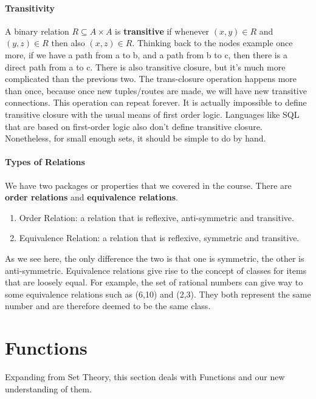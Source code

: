 \paragraph{Transitivity} A binary relation $R \subseteq A \times A$ is \textbf{transitive} if whenever $\left(x,y \right) \in R$ and $\left(y,z \right) \in R$ then also $\left(x,z \right) \in R$. Thinking back to the nodes example once more, if we have a path from a to b, and a path from b to c, then there is a direct path from a to c. There is also transitive closure, but it's much more complicated than the previous two.
The trans-closure operation happens more than once, because once new tuples/routes are made, we will have new transitive connections. This operation can repeat forever. It is actually impossible to define transitive closure with the usual means of first order logic. Languages like SQL that are based on first-order logic also don't define transitive closure. Nonetheless, for small enough sets, it should be simple to do by hand.

\paragraph{Types of Relations} We have two packages or properties that we covered in the course. There are \textbf{order relations} and \textbf{equivalence relations}.
\begin{enumerate}
	\item Order Relation: a relation that is reflexive, anti-symmetric and transitive.
	\item Equivalence Relation: a relation that is reflexive, symmetric and transitive.
\end{enumerate}
As we see here, the only difference the two is that one is symmetric, the other is anti-symmetric. Equivalence relations give rise to the concept of classes for items that are loosely equal. For example, the set of rational numbers can give way to some equivalence relations such as (6,10) and (2,3). They both represent the same number and are therefore deemed to be the same class.

\section{Functions}
Expanding from Set Theory, this section deals with Functions and our new understanding of them.
